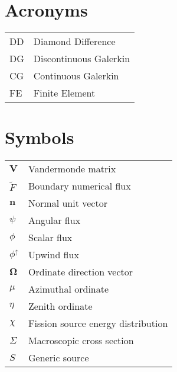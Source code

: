 
\section*{Acronyms}
\begin{tabular}{l l}
DD & Diamond Difference \\
DG & Discontinuous Galerkin \\
CG & Continuous Galerkin \\
FE & Finite Element
\end{tabular}

\section*{Symbols}
\begin{tabular}{l l}
$\mathbf V$ & Vandermonde matrix \\
$\tilde F$ & Boundary numerical flux \\
$\mathbf n$ & Normal unit vector \\
$\psi$ & Angular flux \\
$\phi$ & Scalar flux \\
$\phi^{\uparrow}$ & Upwind flux \\
$\mathbf \Omega$ & Ordinate direction vector \\
$\mu$ & Azimuthal ordinate \\
$\eta$ & Zenith ordinate \\
$\chi$  & Fission source energy distribution \\
$\Sigma$ & Macroscopic cross section \\
$S$ & Generic source
\end{tabular}

\pagebreak
